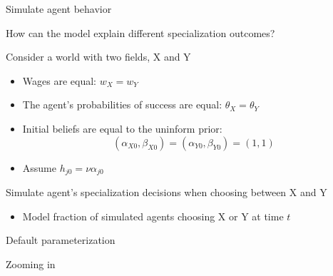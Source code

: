 \begin{frame}{Simulate agent behavior}\label{simulate}


How can the model explain different specialization outcomes?

\vspace{3ex}
Consider a world with two fields, X and Y
\begin{itemize}
    \item Wages are equal: $w_X = w_Y$
    \item The agent's probabilities of success are equal: $\theta_X = \theta_Y$
    \item Initial beliefs are equal to the uninform prior: \hyperlink{model_beta_11}{}
    \begin{equation*}
        (\alpha_{X0}, \beta_{X0}) = (\alpha_{Y0}, \beta_{Y0}) = (1, 1)
    \end{equation*}
    \item Assume $h_{j0} = \nu \alpha_{j0}$ \hyperlink{sim_parameterization}{}
\end{itemize}

\vspace{3ex}
Simulate agent's specialization decisions when choosing between X and Y
\begin{itemize}
    \item Model fraction of simulated agents choosing X or Y at time $t$ 
\end{itemize}


\end{frame}

\begin{frame}{Default parameterization}\label{sim_default}

% 
\begin{figure}
\centering

\end{figure}

\hyperlink{model_beta_11}{}
\end{frame}

\begin{frame}{Zooming in}


\begin{figure}
\centering

\end{figure}


\end{frame}

